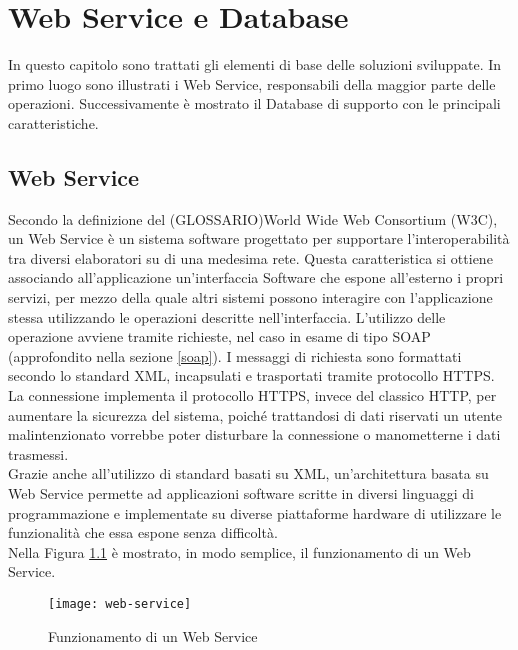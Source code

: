
\chapter{Web Service e Database}
\label{cap:sviluppo-software}

In questo capitolo sono trattati gli elementi di base delle soluzioni sviluppate. In primo luogo sono illustrati i Web Service, responsabili della maggior parte delle operazioni. Successivamente è mostrato il Database di supporto con le principali caratteristiche.


\section{Web Service}

Secondo la definizione del (GLOSSARIO)World Wide Web Consortium (W3C), un Web Service è un sistema software progettato per supportare l'interoperabilità tra diversi elaboratori su di una medesima rete.
Questa caratteristica si ottiene associando all'applicazione un'interfaccia Software che espone all'esterno i propri servizi, per mezzo della quale altri sistemi possono interagire con l'applicazione stessa utilizzando le operazioni descritte nell'interfaccia. L'utilizzo delle operazione avviene tramite richieste, nel caso in esame di tipo SOAP (approfondito nella sezione \ref{soap}). I messaggi di richiesta sono formattati secondo lo standard XML, incapsulati e trasportati tramite protocollo HTTPS. 
La connessione implementa il protocollo HTTPS, invece del classico HTTP, per aumentare la sicurezza del sistema, poiché trattandosi di dati riservati un utente malintenzionato vorrebbe poter disturbare la connessione o manometterne i dati trasmessi.\\
Grazie anche all'utilizzo di standard basati su XML, un'architettura basata su Web Service permette ad applicazioni software scritte in diversi linguaggi di programmazione e implementate su diverse piattaforme hardware di utilizzare le funzionalità che essa espone senza difficoltà.
\\Nella Figura \ref{webservice} è mostrato, in modo semplice, il funzionamento di un Web Service.

\begin{figure}[!h] 
    \centering 
    \texttt{[image: web-service]} 
    \caption{Funzionamento di un Web Service}
    \label{webservice}
\end{figure}


